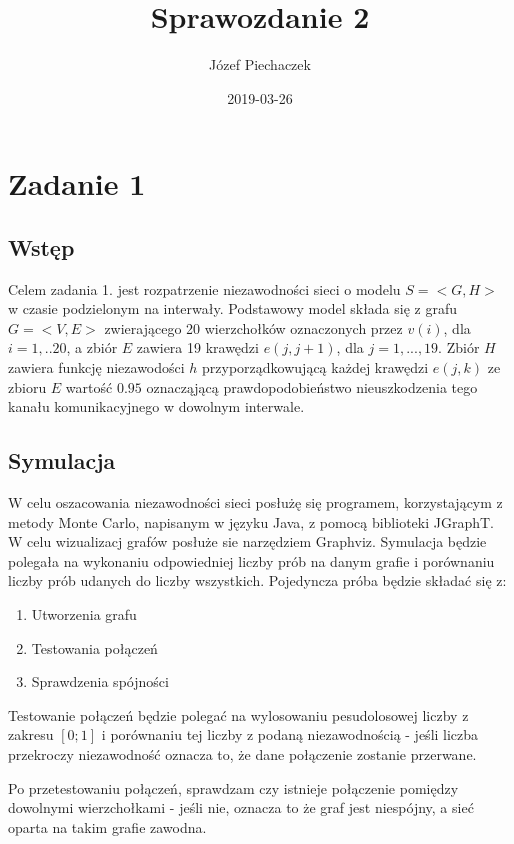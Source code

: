 \documentclass[titlepage]{article}
\title{Sprawozdanie 2}
\date{2019-03-26}
\author{Józef Piechaczek}
\begin{document}
\maketitle
\newpage
{}

\section{Zadanie 1}

\subsection{Wstęp}
Celem zadania 1. jest rozpatrzenie niezawodności sieci o modelu $S = <G, H>$ w czasie podzielonym na interwały. 
Podstawowy model składa się z grafu \linebreak $G = <V, E>$ zwierającego 20 wierzchołków oznaczonych przez $v(i)$, dla \linebreak $i = 1,..20$, a zbiór $E$ zawiera 19 krawędzi $e(j,j+1)$, dla $j = 1, ...,19$. Zbiór $H$ zawiera funkcję niezawodości $h$ przyporządkowującą każdej krawędzi $e(j,k)$ ze zbioru $E$ wartość $0.95$ oznacząjącą prawdopodobieństwo nieuszkodzenia tego kanału komunikacyjnego w dowolnym interwale. 

\subsection{Symulacja}
W celu oszacowania niezawodności sieci posłużę się programem, korzystającym z metody Monte Carlo, napisanym w języku Java, z pomocą biblioteki JGraphT. W celu wizualizacj grafów posłuże sie narzędziem Graphviz. Symulacja będzie polegała na wykonaniu odpowiedniej liczby prób na danym grafie i porównaniu liczby prób udanych do liczby wszystkich. Pojedyncza próba będzie składać się z:
\begin{enumerate}
\itemsep0em 
\item Utworzenia grafu
\item Testowania połączeń
\item Sprawdzenia spójności
\end{enumerate}
Testowanie połączeń będzie polegać na wylosowaniu pesudolosowej liczby z zakresu $[0; 1]$
i porównaniu tej liczby z podaną niezawodnością - jeśli liczba przekroczy niezawodność oznacza to, że dane połączenie zostanie przerwane.

Po przetestowaniu połączeń, sprawdzam czy istnieje połączenie pomiędzy dowolnymi wierzchołkami - jeśli nie, oznacza to że graf jest niespójny, a sieć oparta na takim grafie zawodna. 
\end{document}
